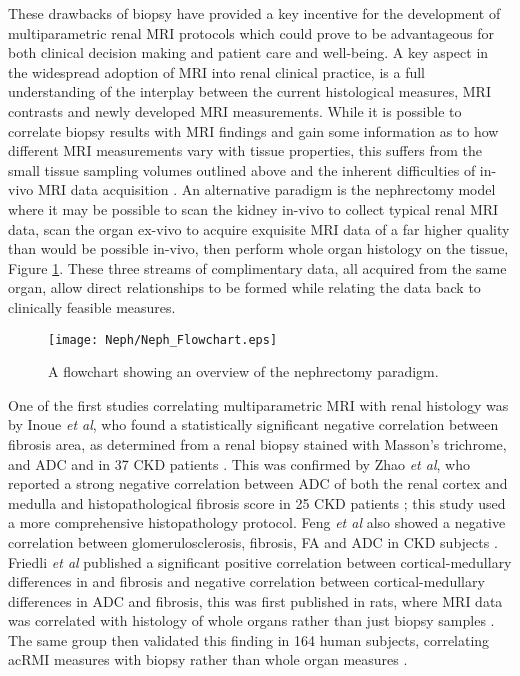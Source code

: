 These drawbacks of biopsy have provided a key incentive for the development of multiparametric renal \ac{MRI} protocols which could prove to be advantageous for both clinical decision making and patient care and well-being. A key aspect in the widespread adoption of \ac{MRI} into renal clinical practice, is a full understanding of the interplay between the current histological measures, \ac{MRI} contrasts and newly developed \ac{MRI} measurements. While it is possible to correlate biopsy results with \ac{MRI} findings and gain some information as to how different \ac{MRI} measurements vary with tissue properties, this suffers from the small tissue sampling volumes outlined above and the inherent difficulties of in-vivo \ac{MRI} data acquisition \cite{leung_could_2017}. An alternative paradigm is the nephrectomy model where it may be possible to scan the kidney in-vivo to collect typical renal \ac{MRI} data, scan the organ ex-vivo to acquire exquisite \ac{MRI} data of a far higher quality than would be possible in-vivo, then perform whole organ histology on the tissue, Figure \ref{fig:ex_neph_flowchart}. These three streams of complimentary data, all acquired from the same organ, allow direct relationships to be formed while relating the data back to clinically feasible measures.

\begin{figure}[H]
	\centering
	\texttt{[image: Neph/Neph\_Flowchart.eps]}
	\caption{A flowchart showing an overview of the nephrectomy paradigm.}
	\label{fig:ex_neph_flowchart}	
\end{figure}


One of the first studies correlating multiparametric \ac{MRI} with renal histology was by Inoue \textit{et al}, who found a statistically significant negative correlation between fibrosis area, as determined from a renal biopsy stained with Masson's trichrome, and \ac{ADC} and \ttwostar in 37 \ac{CKD} patients \cite{inoue_noninvasive_2011}. This was confirmed by Zhao \textit{et al}, who reported a strong negative correlation between \ac{ADC} of both the renal cortex and medulla and histopathological fibrosis score in 25 \ac{CKD} patients \cite{zhao_assessment_2014}; this study used a more comprehensive histopathology protocol. Feng \textit{et al} also showed a negative correlation between glomerulosclerosis, fibrosis, \ac{FA} and \ac{ADC} in \ac{CKD} subjects \cite{feng_dti_2015}. Friedli \textit{et al} published a significant positive correlation between cortical-medullary differences in \tone and fibrosis and negative correlation between cortical-medullary differences in  \ac{ADC} and fibrosis, this was first published in rats, where \ac{MRI} data was correlated with histology of whole organs rather than just biopsy samples \cite{friedli_new_2016}. The same group then validated this finding in 164 human subjects, correlating ac{RMI} measures with biopsy rather than whole organ measures \cite{berchtold_validation_2020}.

